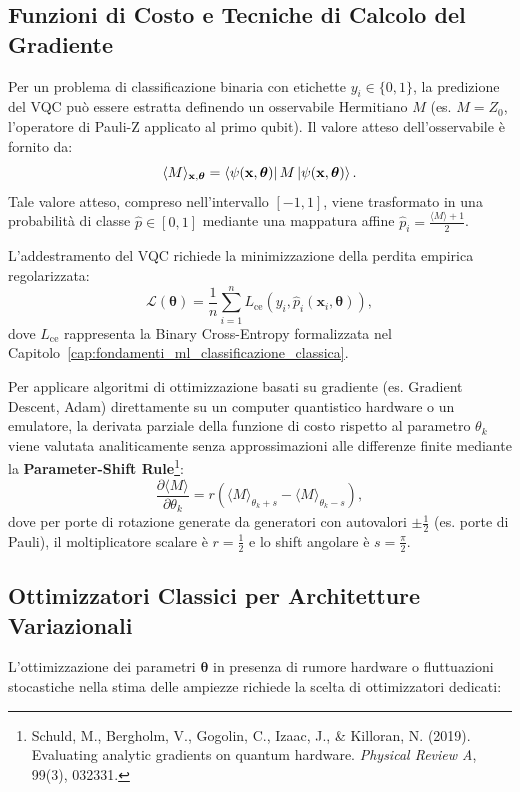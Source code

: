\subsection{Funzioni di Costo e Tecniche di Calcolo del Gradiente}
Per un problema di classificazione binaria con etichette $y_i \in \{0, 1\}$, la predizione del VQC può essere estratta definendo un osservabile Hermitiano $M$ (es. $M = Z_0$, l'operatore di Pauli-Z applicato al primo qubit). Il valore atteso dell'osservabile è fornito da:
\begin{equation}
\langle M \rangle_{\mathbf{x}, \boldsymbol{\theta}} = \bra{\psi(\mathbf{x}, \boldsymbol{\theta})} M \ket{\psi(\mathbf{x}, \boldsymbol{\theta})}.
\end{equation}
Tale valore atteso, compreso nell'intervallo $[-1, 1]$, viene trasformato in una probabilità di classe $\hat{p} \in [0, 1]$ mediante una mappatura affine $\hat{p}_i = \frac{\langle M \rangle + 1}{2}$.

L'addestramento del VQC richiede la minimizzazione della perdita empirica regolarizzata:
\begin{equation}
\mathcal{L}(\boldsymbol{\theta}) = \frac{1}{n} \sum_{i=1}^{n} L_{\text{ce}}(y_i, \hat{p}_i(\mathbf{x}_i, \boldsymbol{\theta})),
\end{equation}
dove $L_{\text{ce}}$ rappresenta la Binary Cross-Entropy formalizzata nel Capitolo~\ref{cap:fondamenti_ml_classificazione_classica}.

Per applicare algoritmi di ottimizzazione basati su gradiente (es. Gradient Descent, Adam) direttamente su un computer quantistico hardware o un emulatore, la derivata parziale della funzione di costo rispetto al parametro $\theta_k$ viene valutata analiticamente senza approssimazioni alle differenze finite mediante la \textbf{Parameter-Shift Rule}\footnote{Schuld, M., Bergholm, V., Gogolin, C., Izaac, J., \& Killoran, N. (2019). Evaluating analytic gradients on quantum hardware. \textit{Physical Review A}, 99(3), 032331.}:
\begin{equation}
\frac{\partial \langle M \rangle}{\partial \theta_k} = r \left( \langle M \rangle_{\theta_k + s} - \langle M \rangle_{\theta_k - s} \right),
\end{equation}
dove per porte di rotazione generate da generatori con autovalori $\pm \frac{1}{2}$ (es. porte di Pauli), il moltiplicatore scalare è $r = \frac{1}{2}$ e lo shift angolare è $s = \frac{\pi}{2}$.

\subsection{Ottimizzatori Classici per Architetture Variazionali}
L'ottimizzazione dei parametri $\boldsymbol{\theta}$ in presenza di rumore hardware o fluttuazioni stocastiche nella stima delle ampiezze richiede la scelta di ottimizzatori dedicati:


